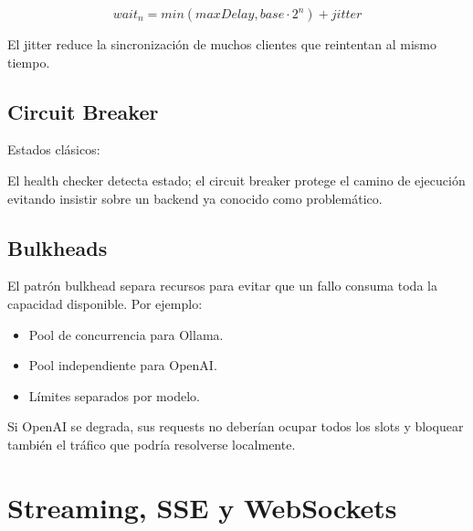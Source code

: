 \documentclass[11pt,a4paper]{article}
\begin{document}
\[
wait_n = min(maxDelay, base \cdot 2^n) + jitter
\]

El jitter reduce la sincronización de muchos clientes que reintentan al mismo tiempo.

\subsection{Circuit Breaker}

Estados clásicos:

\begin{center}
\end{center}

El health checker detecta estado; el circuit breaker protege el camino de ejecución evitando insistir sobre un backend ya conocido como problemático.

\subsection{Bulkheads}

El patrón bulkhead separa recursos para evitar que un fallo consuma toda la capacidad disponible. Por ejemplo:

\begin{itemize}
  \item Pool de concurrencia para Ollama.
  \item Pool independiente para OpenAI.
  \item Límites separados por modelo.
\end{itemize}

Si OpenAI se degrada, sus requests no deberían ocupar todos los slots y bloquear también el tráfico que podría resolverse localmente.

\section{Streaming, SSE y WebSockets}
\end{document}
